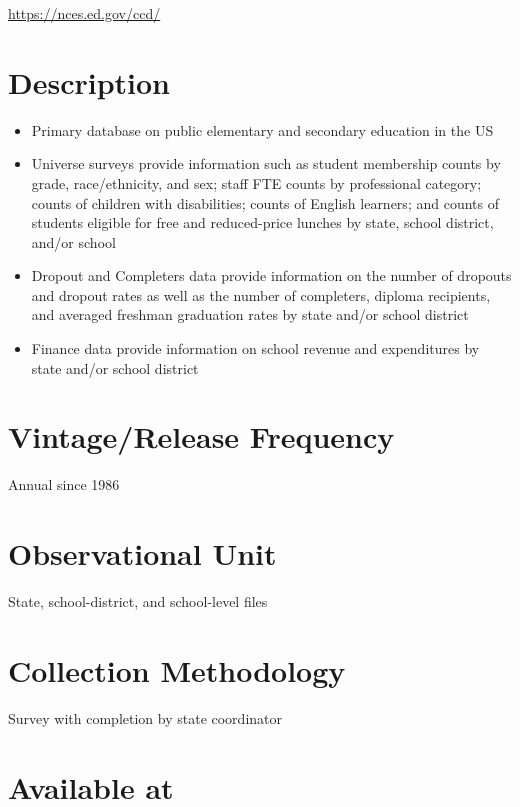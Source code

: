 \documentclass[
]{book}
\providecommand{\tightlist}{%
  \setlength{\itemsep}{0pt}\setlength{\parskip}{0pt}}
\begin{document}
\url{https://nces.ed.gov/ccd/}

\hypertarget{description-17}{%
\section{Description}\label{description-17}}

\begin{itemize}
\tightlist
\item
  Primary database on public elementary and secondary education in the US
\item
  Universe surveys provide information such as student membership counts by grade, race/ethnicity, and sex; staff FTE counts by professional category; counts of children with disabilities; counts of English learners; and counts of students eligible for free and reduced-price lunches by state, school district, and/or school
\item
  Dropout and Completers data provide information on the number of dropouts and dropout rates as well as the number of completers, diploma recipients, and averaged freshman graduation rates by state and/or school district
\item
  Finance data provide information on school revenue and expenditures by state and/or school district
\end{itemize}

\hypertarget{vintagerelease-frequency-17}{%
\section{Vintage/Release Frequency}\label{vintagerelease-frequency-17}}

Annual since 1986

\hypertarget{observational-unit-17}{%
\section{Observational Unit}\label{observational-unit-17}}

State, school-district, and school-level files

\hypertarget{collection-methodology-17}{%
\section{Collection Methodology}\label{collection-methodology-17}}

Survey with completion by state coordinator

\hypertarget{available-at-17}{%
\section{Available at}\label{available-at-17}}
\end{document}
